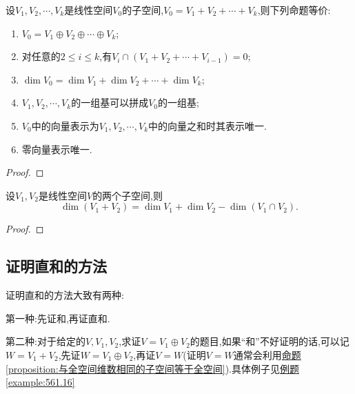 \documentclass[lang=cn,newtx,10pt,scheme=chinese]{elegantbook}
\begin{document}
\begin{theorem}[直和的等价条件]\label{theorem:直和的等价条件}
设\(V_1,V_2,\cdots,V_k\)是线性空间\(V_0\)的子空间,\(V_0 = V_1 + V_2+\cdots+V_k\),则下列命题等价:
\begin{enumerate}[(1)]
\item \label{theorem:直和的等价条件1}\(V_0 = V_1\oplus V_2\oplus\cdots\oplus V_k\);
\item \label{theorem:直和的等价条件2}对任意的\(2\leq i\leq k\),有\(V_i\cap(V_1 + V_2+\cdots+V_{i - 1}) = 0\);
\item \label{theorem:直和的等价条件3}\(\dim V_0=\dim V_1+\dim V_2+\cdots+\dim V_k\);
\item \label{theorem:直和的等价条件4}\(V_1,V_2,\cdots,V_k\)的一组基可以拼成\(V_0\)的一组基;
\item \label{theorem:直和的等价条件5}\(V_0\)中的向量表示为\(V_1,V_2,\cdots,V_k\)中的向量之和时其表示唯一.
\item 零向量表示唯一.
\end{enumerate}
\end{theorem}
\begin{proof}

\end{proof} 

\begin{theorem}[维数公式]\label{theorem:维数公式}
设\(V_1,V_2\)是线性空间\(V\)的两个子空间,则
\[
\dim(V_1 + V_2)=\dim V_1+\dim V_2-\dim(V_1\cap V_2).
\]
\end{theorem}
\begin{proof}

\end{proof}

\subsection{证明直和的方法}
证明直和的方法大致有两种:

第一种:先证和,再证直和. 

第二种:对于给定的\(V,V_1,V_2\),求证\(V = V_1\oplus V_2\)的题目,如果“和”不好证明的话,可以记\(W = V_1 + V_2\),先证\(W = V_1\oplus V_2\),再证\(V = W\)(证明\(V = W\)通常会利用\hyperref[proposition:与全空间维数相同的子空间等于全空间]{命题\ref{proposition:与全空间维数相同的子空间等于全空间}}).具体例子见\hyperref[example:561.16]{例题\ref{example:561.16}}
\end{document}
